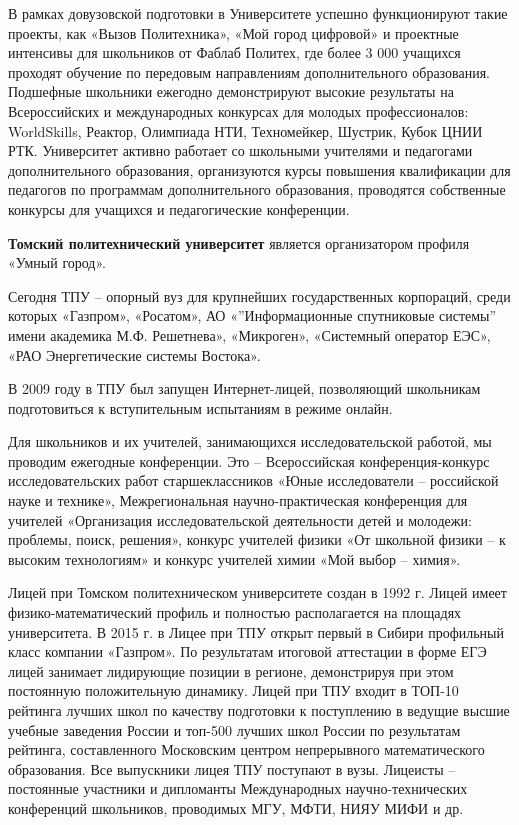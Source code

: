 В рамках довузовской подготовки в Университете успешно функционируют такие проекты, как «Вызов Политехника», «Мой город цифровой» и проектные интенсивы для школьников от Фаблаб Политех, где более 3 000 учащихся проходят обучение по передовым направлениям дополнительного образования. Подшефные школьники ежегодно демонстрируют высокие результаты на Всероссийских и международных конкурсах для молодых профессионалов: WorldSkills, Реактор, Олимпиада НТИ, Техномейкер, Шустрик, Кубок ЦНИИ РТК. Университет активно работает со школьными учителями и педагогами дополнительного образования, организуются курсы повышения квалификации для педагогов по программам дополнительного образования, проводятся собственные конкурсы для учащихся и педагогические конференции.

\textbf{Томский политехнический университет} является организатором профиля «Умный город».

Сегодня ТПУ – опорный вуз для крупнейших государственных корпораций, среди которых «Газпром», «Росатом», АО «”Информационные спутниковые системы” имени академика М.Ф. Решетнева», «Микроген», «Системный оператор ЕЭС», «РАО Энергетические системы Востока».

В 2009 году в ТПУ был запущен Интернет-лицей, позволяющий школьникам подготовиться к вступительным испытаниям в режиме онлайн.

Для школьников и их учителей, занимающихся исследовательской работой, мы проводим ежегодные конференции. Это – Всероссийская конференция-конкурс исследовательских работ старшеклассников «Юные исследователи – российской науке и технике», Межрегиональная научно-практическая конференция для учителей «Организация исследовательской деятельности детей и молодежи: проблемы, поиск, решения»,  конкурс учителей физики «От школьной физики – к высоким технологиям» и конкурс учителей химии «Мой выбор – химия».

Лицей при Томском политехническом университете создан в 1992 г. Лицей имеет физико-математический профиль и полностью располагается на площадях университета. В  2015 г.  в Лицее при ТПУ открыт первый в Сибири профильный класс компании «Газпром». По результатам итоговой аттестации в форме ЕГЭ  лицей занимает лидирующие позиции в регионе, демонстрируя при этом постоянную положительную динамику. Лицей при ТПУ входит  в ТОП-10  рейтинга лучших школ по качеству подготовки к поступлению в ведущие высшие учебные заведения России и топ-500 лучших школ России по результатам рейтинга, составленного Московским центром непрерывного математического образования. Все выпускники лицея ТПУ поступают в вузы. Лицеисты – постоянные участники и дипломанты Международных научно-технических конференций школьников, проводимых МГУ, МФТИ, НИЯУ МИФИ и др.

